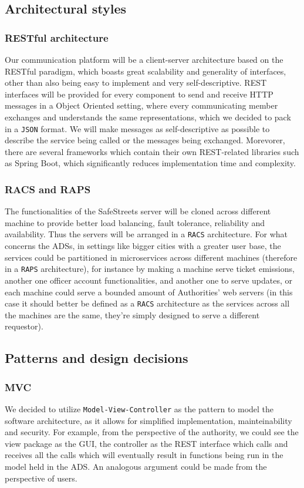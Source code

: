 \documentclass[12pt,a4paper]{article}
\begin{document}
\subsection{Architectural styles}
\subsubsection{RESTful architecture}
Our communication platform will be a client-server architecture based on the RESTful paradigm, which boasts great scalability and generality of interfaces, other than also being easy to implement and very self-descriptive. REST interfaces will be provided for every component to send and receive HTTP messages in a Object Oriented setting, where every communicating member exchanges and understands the same representations, which we decided to pack in a \texttt{JSON} format. We will make messages as self-descriptive as possible to describe the service being called or the messages being exchanged. Morevorer, there are several frameworks which contain their own REST-related libraries such as Spring Boot, which significantly reduces implementation time and complexity.
\subsubsection{RACS and RAPS}
The functionalities of the SafeStreets server will be cloned across different machine to provide better load balancing, fault tolerance, reliability and availability. Thus the servers will be arranged in a \texttt{RACS} architecture. For what concerns the ADSs, in settings like bigger cities with a greater user base, the services could be partitioned in microservices across different machines (therefore in a \texttt{RAPS} architecture), for instance by making a machine serve ticket emissions, another one officer account functionalities, and another one to serve updates, or each machine could serve a bounded amount of Authorities' web servers (in this case it should better be defined as a \texttt{RACS} architecture as the services across all the machines are the same, they're simply designed to serve a different requestor).
\subsection{Patterns and design decisions}
\subsubsection{MVC}
We decided to utilize \texttt{Model-View-Controller} as the pattern to model the software architecture, as it allows for simplified implementation, mainteinability and security. For example, from the perspective of the authority, we could see the view package as the GUI, the controller as the REST interface which calls and receives all the calls which will eventually result in functions being run in the model held in the ADS. An analogous argument could be made from the perspective of users. 
\end{document}
